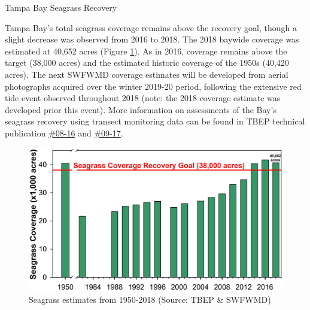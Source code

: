 \documentclass[final,t]{beamer}\usepackage[]{graphicx}\usepackage[]{color}
\begin{document}
\begin{frame}
\begin{columns}[t]
\begin{column}{.79\linewidth}
\begin{block}{Tampa Bay Seagrass Recovery}
\vspace{-0.15in}
\begin{minipage}{0.6\textwidth}
\footnotesize
Tampa Bay's total seagrass coverage remains above the recovery goal, though a slight decrease was observed from 2016 to 2018. The 2018 baywide coverage was estimated at 40,652 acres (Figure \ref{fig:sgtrnd}). As in 2016, coverage remains above the target (38,000 acres) and the estimated historic coverage of the 1950s (40,420 acres). The next SWFWMD coverage estimates will be developed from aerial photographs acquired over the winter 2019-20 period, following the extensive red tide event observed throughout 2018 (note: the 2018 coverage estimate was developed prior this event). More information on assessments of the Bay's seagrass recovery using transect monitoring data can be found in TBEP technical publication \href{(https://tbeptech.org/TBEP_TECH_PUBS/2016/TBEP_08_16_2016_Seagrass_Transect_Summary_Report.pdf}{\#08-16} and \href{https://www.tbeptech.org/TBEP_TECH_PUBS/2017/TBEP_09_17_Sherwood_et_al_TB_Seagrass_SE_Geographer_project_muse_667989.pdf}{\#09-17}.
\end{minipage}
\hspace{0.2in}
\begin{minipage}{0.32\textwidth}
\vspace{0.1in}
\begin{figure}
\includegraphics[width=\textwidth, trim = 0cm 0cm 0cm -1cm]{www/Seagrass_Acreage_1950_2018.png}
\caption{\footnotesize Seagrass estimates from 1950-2018 (Source: TBEP \& SWFWMD)}
\label{fig:sgtrnd}
\end{figure}
\end{minipage}
\end{block}


\end{column}
\end{columns}
\end{frame}
\end{document}
